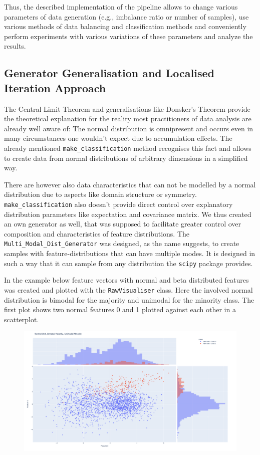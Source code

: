 Thus, the described implementation of the pipeline allows to change
various parameters of data generation (e.g., imbalance ratio or number
of samples), use various methods of data balancing and classification
methods and conveniently perform experiments with various variations of
these parameters and analyze the results.


\subsection{Generator Generalisation and Localised Iteration Approach}

The Central Limit Theorem and generalisations like Donsker's Theorem provide the theoretical explanation for the reality most practitioners
of data analysis are already well aware of: The normal distribution is omnipresent and occurs even in many circumstances one wouldn't expect due to accumulation effects.
The already mentioned \texttt{make\_classification} method recognises this fact and allows to create data from normal distributions of arbitrary dimensions in a simplified way.

There are however also data characteristics that can not be modelled by a normal distribution due to aspects like domain structure or symmetry.
\texttt{make\_classification} also doesn't provide direct control over explanatory distribution parameters like expectation and covariance matrix.
We thus created an own generator as well, that was supposed to facilitate greater control over composition and characteristics of feature distributions.
The \texttt{Multi\_Modal\_Dist\_Generator} was designed, as the name suggests, to create samples with feature-distributions that can have multiple modes.
It is designed in such a way that it can sample from any distribution the \texttt{scipy} package provides.

In the example below feature vectors with normal and beta distributed features was created and plotted with the \texttt{RawVisualiser} class.
Here the involved normal distribution is bimodal for the majority and unimodal for the minority class. 
The first plot shows two normal features 0 and 1 plotted against each other in a scatterplot. 

\begin{figure}[H]
	\centering
  	\includegraphics[width=\linewidth]{assets/data_vis/Normal_Dist_Bimodal.png}
  	\label{fig:Bimodal Normal}
\end{figure}

